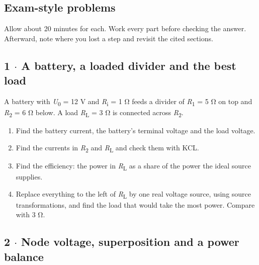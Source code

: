 \documentclass[11pt]{article}
\begin{document}
\begin{keepsection}
\section{Exam-style problems}

Allow about 20 minutes for each. Work every part before checking the answer. Afterward, note where you lost a step and revisit the cited sections.

\begin{keepsection}
\subsection{1 \ensuremath{\cdot} A battery, a loaded divider and the best load}

A battery with \textit{U}\textsubscript{0} = 12 V and \textit{R}\textsubscript{i} = 1 Ω feeds a divider of \textit{R}\textsubscript{1} = 5 Ω on top and \textit{R}\textsubscript{2} = 6 Ω below. A load \textit{R}\textsubscript{L} = 3 Ω is connected across \textit{R}\textsubscript{2}.

\begin{enumerate}
\item Find the battery current, the battery’s terminal voltage and the load voltage.
\item Find the currents in \textit{R}\textsubscript{2} and \textit{R}\textsubscript{L} and check them with KCL.
\item Find the efficiency: the power in \textit{R}\textsubscript{L} as a share of the power the ideal source supplies.
\item Replace everything to the left of \textit{R}\textsubscript{L} by one real voltage source, using source transformations, and find the load that would take the most power. Compare with 3 Ω.
\end{enumerate}

\end{keepsection}

\begin{keepsection}
\subsection{2 \ensuremath{\cdot} Node voltage, superposition and a power balance}


\end{keepsection}
\end{keepsection}
\end{document}
